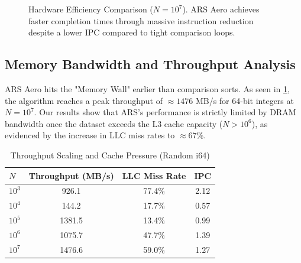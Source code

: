 \begin{figure}[htbp]
\centering
{}
\caption{Hardware Efficiency Comparison ($N=10^7$). ARS Aero achieves faster completion times through massive instruction reduction despite a lower IPC compared to tight comparison loops.}
\label{fig:hardware_efficiency}
\end{figure}

\subsection{Memory Bandwidth and Throughput Analysis}
ARS Aero hits the "Memory Wall" earlier than comparison sorts. As seen in \cref{tab:throughput}, the algorithm reaches a peak throughput of $\approx 1476$ MB/s for 64-bit integers at $N=10^7$. Our results show that ARS's performance is strictly limited by DRAM bandwidth once the dataset exceeds the L3 cache capacity ($N > 10^6$), as evidenced by the increase in LLC miss rates to $\approx 67\%$.

\begin{table}[h]
\caption{Throughput Scaling and Cache Pressure (Random i64)}
\label{tab:throughput}
\centering
\begin{tabular}{lccc}
\toprule
$N$ & Throughput (MB/s) & LLC Miss Rate & IPC \\
\midrule
$10^3$ & 926.1 & 77.4\% & 2.12 \\
$10^4$ & 144.2 & 17.7\% & 0.57 \\
$10^5$ & 1381.5 & 13.4\% & 0.99 \\
$10^6$ & 1075.7 & 47.7\% & 1.39 \\
$10^7$ & 1476.6 & 59.0\% & 1.27 \\
\bottomrule
\end{tabular}
\end{table}

